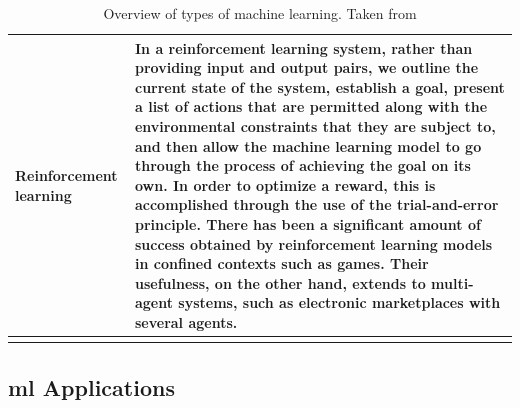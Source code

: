 \begin{longtable}{| p{} | p{} |}
    \hline
    Reinforcement learning & In a reinforcement learning system, rather than providing input and output pairs, we outline the current state of the system, establish a goal, present a list of actions that are permitted along with the environmental constraints that they are subject to, and then allow the machine learning model to go through the process of achieving the goal on its own. In order to optimize a reward, this is accomplished through the use of the trial-and-error principle. There has been a significant amount of success obtained by reinforcement learning models in confined contexts such as games. Their usefulness, on the other hand, extends to multi-agent systems, such as electronic marketplaces with several agents. \\
    \hline
  \caption{Overview of types of machine learning. Taken from \cite{janiesch2021machine}}
  \label{tab:typesofML}
\end{longtable}

\subsection{\acrshort{ml} Applications}

